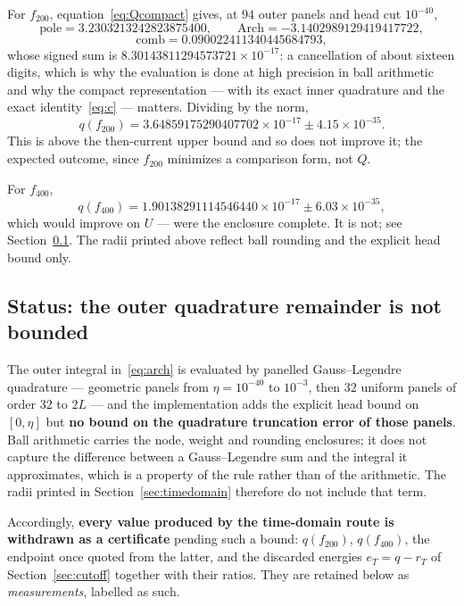 \documentclass[11pt,a4paper]{article}
\theoremstyle{definition}
\theoremstyle{remark}
\begin{document}
For $f_{200}$, equation~\eqref{eq:Qcompact} gives, at $94$ outer panels and head
cut $10^{-40}$,
\[
  \text{pole} = 3.2303213242823875400,\qquad
  \mathrm{Arch} = -3.1402989129419417722,
\]
\[
  \text{comb} = 0.090022411340445684793,
\]
whose signed sum is $8.30143811294573721\times10^{-17}$: a cancellation of about
sixteen digits, which is why the evaluation is done at high precision in ball
arithmetic and why the compact representation --- with its exact inner
quadrature and the exact identity~\eqref{eq:c} --- matters. Dividing by the norm,
\[
  q(f_{200}) = 3.64859175290407702\times10^{-17} \pm 4.15\times10^{-35}.
\]
This is above the then-current upper bound and so does not improve it; the
expected outcome, since $f_{200}$ minimizes a comparison form, not $Q$.

For $f_{400}$,
\[
  q(f_{400}) = 1.90138291114546440\times10^{-17} \pm 6.03\times10^{-35},
\]
which would improve on $U$ --- were the enclosure complete. It is not; see
Section~\ref{sec:status}. The radii printed above reflect ball rounding and the
explicit head bound only.

\subsection{Status: the outer quadrature remainder is not bounded}
\label{sec:status}

The outer integral in~\eqref{eq:arch} is evaluated by panelled Gauss--Legendre
quadrature --- geometric panels from $\eta = 10^{-40}$ to $10^{-3}$, then $32$
uniform panels of order $32$ to $2L$ --- and the implementation adds the
explicit head bound on $[0,\eta]$ but \textbf{no bound on the quadrature
truncation error of those panels}. Ball arithmetic carries the node, weight and
rounding enclosures; it does not capture the difference between a
Gauss--Legendre sum and the integral it approximates, which is a property of the
rule rather than of the arithmetic. The radii printed in
Section~\ref{sec:timedomain} therefore do not include that term.

Accordingly, \textbf{every value produced by the time-domain route is withdrawn
as a certificate} pending such a bound: $q(f_{200})$, $q(f_{400})$, the endpoint
once quoted from the latter, and the discarded energies
$e_T = q - r_T$ of Section~\ref{sec:cutoff} together with their ratios. They are
retained below as \emph{measurements}, labelled as such.
\end{document}
